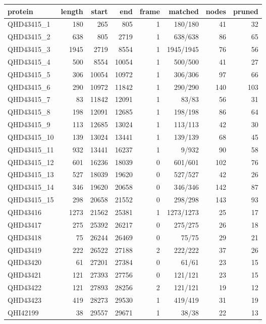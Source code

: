 \begin{tabular}{lrrrrrrr}
\hline
protein & length & start & end & frame & matched & nodes & pruned \\
\hline
QHD43415\_1 & 180 & 265 & 805 & 1 & 180/180 & 41 & 32 \\
QHD43415\_2 & 638 & 805 & 2719 & 1 & 638/638 & 86 & 65 \\
QHD43415\_3 & 1945 & 2719 & 8554 & 1 & 1945/1945 & 76 & 56 \\
QHD43415\_4 & 500 & 8554 & 10054 & 1 & 500/500 & 41 & 27 \\
QHD43415\_5 & 306 & 10054 & 10972 & 1 & 306/306 & 97 & 66 \\
QHD43415\_6 & 290 & 10972 & 11842 & 1 & 290/290 & 140 & 103 \\
QHD43415\_7 & 83 & 11842 & 12091 & 1 & 83/83 & 56 & 31 \\
QHD43415\_8 & 198 & 12091 & 12685 & 1 & 198/198 & 86 & 64 \\
QHD43415\_9 & 113 & 12685 & 13024 & 1 & 113/113 & 42 & 30 \\
QHD43415\_10 & 139 & 13024 & 13441 & 1 & 139/139 & 68 & 45 \\
QHD43415\_11 & 932 & 13441 & 16237 & 1 & 9/932 & 90 & 58 \\
QHD43415\_12 & 601 & 16236 & 18039 & 0 & 601/601 & 102 & 76 \\
QHD43415\_13 & 527 & 18039 & 19620 & 0 & 527/527 & 42 & 26 \\
QHD43415\_14 & 346 & 19620 & 20658 & 0 & 346/346 & 142 & 87 \\
QHD43415\_15 & 298 & 20658 & 21552 & 0 & 298/298 & 143 & 93 \\
QHD43416 & 1273 & 21562 & 25381 & 1 & 1273/1273 & 25 & 17 \\
QHD43417 & 275 & 25392 & 26217 & 0 & 275/275 & 26 & 18 \\
QHD43418 & 75 & 26244 & 26469 & 0 & 75/75 & 29 & 21 \\
QHD43419 & 222 & 26522 & 27188 & 2 & 222/222 & 37 & 26 \\
QHD43420 & 61 & 27201 & 27384 & 0 & 61/61 & 23 & 15 \\
QHD43421 & 121 & 27393 & 27756 & 0 & 121/121 & 23 & 15 \\
QHD43422 & 121 & 27893 & 28256 & 2 & 121/121 & 19 & 12 \\
QHD43423 & 419 & 28273 & 29530 & 1 & 419/419 & 31 & 19 \\
QHI42199 & 38 & 29557 & 29671 & 1 & 38/38 & 22 & 13 \\
\hline
\end{tabular}